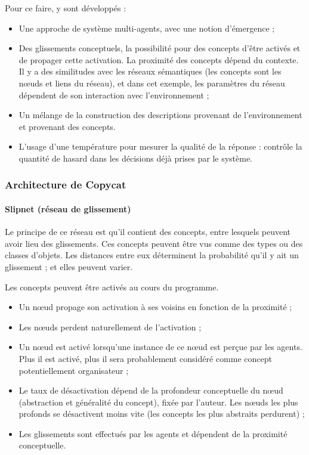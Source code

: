 \documentclass[a4paper, 12pt]{article}
\begin{document}
Pour ce faire, y sont développés :

\begin{itemize}
 \item Une approche de système multi-agents, avec une notion d'émergence ;
 \item Des glissements conceptuels, la possibilité pour des concepts d'être activés et de propager cette activation. La proximité des concepts dépend du contexte. Il y a des similitudes avec les réseaux sémantiques (les concepts sont les n\oe{}uds et liens du réseau), et dans cet exemple, les paramètres du réseau dépendent de son interaction avec l'environnement ;
 \item Un mélange de la construction des descriptions provenant de l'environnement et provenant des concepts.

\item L'usage d'une température pour mesurer la qualité de la réponse : contrôle la quantité de hasard dans les décisions déjà prises par le système.
\end{itemize}

\subsubsection{Architecture de Copycat}

\paragraph{Slipnet (réseau de glissement)}
Le principe de ce réseau est qu'il contient des concepts, entre lesquels peuvent avoir lieu des glissements. Ces concepts peuvent être vus comme des types ou des classes d'objets. Les distances entre eux déterminent la probabilité qu'il y ait un glissement ; et elles peuvent varier.

Les concepts peuvent être activés au cours du programme.

\begin{itemize}
 \item Un n\oe{}ud propage son activation à ses voisins en fonction de la proximité ;
 \item Les n\oe{}uds perdent naturellement de l'activation ;
 \item Un n\oe{}ud est activé lorsqu'une instance de ce n\oe{}ud est perçue par les agents. Plus il est activé, plus il sera probablement considéré comme concept potentiellement organisateur ;
 \item Le taux de désactivation dépend de la profondeur conceptuelle du n\oe{}ud (abstraction et généralité du concept), fixée par l'auteur. Les n\oe{}uds les plus profonds se désactivent moins vite (les concepts les plus abstraits perdurent) ;
 \item Les glissements sont effectués par les agents et dépendent de la proximité conceptuelle.
\end{itemize}
\end{document}
